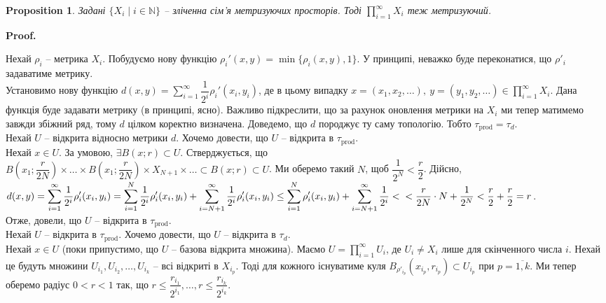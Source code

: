 \documentclass[a4paper, 10pt]{article}
\makeatletter
\theoremstyle{theoremdd}
\newtheorem{proposition}[theorem]{Proposition}
\renewenvironment{proof}[1][Proof.\\]{\par
\pushQED{\hfill \qed}%
\normalfont \topsep6\p@\@plus6\p@\relax
\trivlist
\item\relax
{\bfseries
#1\@addpunct{.}}\hspace\labelsep\ignorespaces
}{%
\popQED\endtrivlist\@endpefalse
}
\makeatother
\begin{document}
\begin{proposition}
Задані $\{X_i \mid i \in \mathbb{N}\}$ -- зліченна сім'я метризуючих просторів. Тоді $\displaystyle\prod_{i=1}^\infty X_i$ теж метризуючий.
\end{proposition}

\begin{proof}
Нехай $\rho_i$ -- метрика $X_i$. Побудуємо нову функцію $\rho_i'(x,y) = \displaystyle\min\{\rho_i(x,y), 1\}$.
 \iffalse $\rho_i'(x,y) = \begin{cases} \rho_i(x,y), & \rho_i(x,y) \leq 1 \\ 1, & \text{інакше} \end{cases}$. \fi У принципі, неважко буде переконатися, що $\rho'_i$ задаватиме метрику.\\
Установимо нову функцію $d(x,y) = \displaystyle\sum_{i=1}^\infty \dfrac{1}{2^i} \rho_i'(x_i,y_i)$, де в цьому випадку $x = (x_1,x_2,\dots),\ y = (y_1,y_2,\dots) \in \displaystyle\prod_{i=1}^\infty X_i$. Дана функція буде задавати метрику (в принципі, ясно). Важливо підкреслити, що за рахунок оновлення метрики на $X_i$ ми тепер матимемо завжди збіжний ряд, тому $d$ цілком коректно визначена. Доведемо, що $d$ породжує ту саму топологію. Тобто $\tau_{\text{prod}} = \tau_d$.\\
Нехай $U$ -- відкрита відносно метрики $d$. Хочемо довести, що $U$ -- відкрита в $\tau_{\text{prod}}$.\\
Нехай $x \in U$. За умовою, $\exists B(x;r) \subset U$. Стверджується, що \\ $B\left(x_1;\dfrac{r}{2N}\right) \times \dots \times B\left(x_1;\dfrac{r}{2N}\right) \times X_{N+1} \times \dots \subset B(x;r) \subset U$. Ми оберемо такий $N$, щоб $\dfrac{1}{2^N} < \dfrac{r}{2}$. Дійсно, \\
$d(x,y) = \displaystyle\sum_{i=1}^\infty \dfrac{1}{2^i} \rho_i'(x_i,y_i) = \sum_{i=1}^N \dfrac{1}{2^i} \rho_i'(x_i,y_i) + \sum_{i=N+1}^\infty \dfrac{1}{2^i} \rho_i'(x_i,y_i) \leq \sum_{i=1}^N \rho_i'(x_i,y_i) + \sum_{i=N+1}^\infty \dfrac{1}{2^i} <\\
< \dfrac{r}{2N} \cdot N + \dfrac{1}{2^{N}} < \dfrac{r}{2} + \dfrac{r}{2} = r$.\\
Отже, довели, що $U$ -- відкрита в $\tau_{\text{prod}}$.\\
Нехай $U$ -- відкрита в $\tau_{\text{prod}}$. Хочемо довести, що $U$ -- відкрита в $\tau_{d}$.\\
Нехай $x \in U$ (поки припустимо, що $U$ -- базова відкрита множина). Маємо $U = \displaystyle\prod_{i=1}^\infty U_i$, де $U_i \neq X_i$ лише для скінченного числа $i$. Нехай це будуть множини $U_{i_1},U_{i_2},\dots,U_{i_k}$ -- всі відкриті в $X_{i_p}$. Тоді для кожного існуватиме куля $B_{\rho'_{i_p}}(x_{i_p},r_{i_p}) \subset U_{i_p}$ при $p = \overline{1,k}$. Ми тепер оберемо радіус $0 < r < 1$ так, що $r \leq \dfrac{r_{i_1}}{2^{i_1}},\dots, r \leq \dfrac{r_{i_k}}{2^{i_k}}$.\\

\end{proof}
\end{document}
